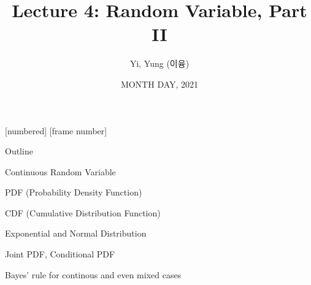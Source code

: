 

\csname\pdfmode\endcsname

{
  [numbered]
  [frame number]  %
} 




\title[]{Lecture 4: Random Variable, Part II}
\author{Yi, Yung (이융)}
\date{MONTH DAY, 2021}








\begin{frame}
  \titlepage
\end{frame}

\begin{frame}{Outline}
\plitemsep 0.1in
\bci
\item Continuous Random Variable

\item PDF (Probability Density Function)

\item CDF (Cumulative Distribution Function)

\item Exponential and Normal Distribution

\item Joint PDF, Conditional PDF

\item Bayes' rule for continous and even mixed cases

\eci
\end{frame}


